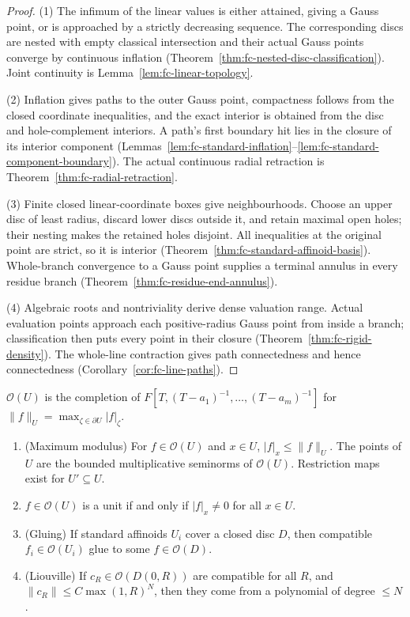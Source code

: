 \begin{proof}
(1) The infimum of the linear values is either attained, giving a Gauss point, or is approached by a strictly decreasing sequence. The corresponding discs are nested with empty classical intersection and their actual Gauss points converge by continuous inflation (Theorem~\ref{thm:fc-nested-disc-classification}). Joint continuity is Lemma~\ref{lem:fc-linear-topology}.

(2) Inflation gives paths to the outer Gauss point, compactness follows from the closed coordinate inequalities, and the exact interior is obtained from the disc and hole-complement interiors. A path's first boundary hit lies in the closure of its interior component (Lemmas~\ref{lem:fc-standard-inflation}--\ref{lem:fc-standard-component-boundary}). The actual continuous radial retraction is Theorem~\ref{thm:fc-radial-retraction}.

(3) Finite closed linear-coordinate boxes give neighbourhoods. Choose an upper disc of least radius, discard lower discs outside it, and retain maximal open holes; their nesting makes the retained holes disjoint. All inequalities at the original point are strict, so it is interior (Theorem~\ref{thm:fc-standard-affinoid-basis}). Whole-branch convergence to a Gauss point supplies a terminal annulus in every residue branch (Theorem~\ref{thm:fc-residue-end-annulus}).

(4) Algebraic roots and nontriviality derive dense valuation range. Actual evaluation points approach each positive-radius Gauss point from inside a branch; classification then puts every point in their closure (Theorem~\ref{thm:fc-rigid-density}). The whole-line contraction gives path connectedness and hence connectedness (Corollary~\ref{cor:fc-line-paths}).
\end{proof}

\begin{definition}\label{def:fc-line-algebra}
\notready
{}
$\mathcal O(U)$ is the completion of $F[T,(T-a_1)^{-1},\dots,(T-a_m)^{-1}]$ for $\|f\|_U=\max_{\zeta\in\partial U}|f|_\zeta$.
\end{definition}

\begin{lemma}[Functions]\label{lem:fc-line-functions}
\notready
{}
\begin{enumerate}
\item (Maximum modulus) For $f\in\mathcal O(U)$ and $x\in U$, $|f|_x\le\|f\|_U$. The points of $U$ are the bounded
multiplicative seminorms of $\mathcal O(U)$. Restriction maps exist for $U'\subseteq U$.
\item $f\in\mathcal O(U)$ is a unit if and only if $|f|_x\ne0$ for all $x\in U$.
\item (Gluing) If standard affinoids $U_i$ cover a closed disc $D$, then compatible $f_i\in\mathcal O(U_i)$ glue to some
$f\in\mathcal O(D)$.
\item (Liouville) If $c_R\in\mathcal O(D(0,R))$ are compatible for all $R$, and $\|c_R\|\le C\max(1,R)^N$, then they come from a
polynomial of degree $\le N$.
\end{enumerate}
\end{lemma}

